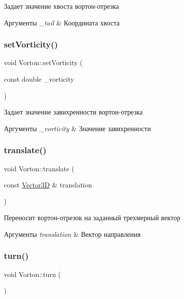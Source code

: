 Задает значение хвоста вортон-\/отрезка 
\begin{DoxyParams}{Аргументы}
{\em \+\_\+tail} & Координата хвоста \\
\hline
\end{DoxyParams}
\mbox{\label{class_vorton_a2684a3a144977b936e7a046bbee1bf78}} 
\subsubsection{\texorpdfstring{set\+Vorticity()}{setVorticity()}}
{\footnotesize\ttfamily void Vorton\+::set\+Vorticity (\begin{DoxyParamCaption}\item[{const double}]{\+\_\+vorticity }\end{DoxyParamCaption})}

Задает значение завихренности вортон-\/отрезка 
\begin{DoxyParams}{Аргументы}
{\em \+\_\+vorticity} & Значение завихренности \\
\hline
\end{DoxyParams}
\mbox{\label{class_vorton_a0b826326d0c9c93298b95babb17b43a1}} 
\subsubsection{\texorpdfstring{translate()}{translate()}}
{\footnotesize\ttfamily void Vorton\+::translate (\begin{DoxyParamCaption}\item[{const \mbox{\hyperlink{class_vector3_d}{Vector3D}} \&}]{translation }\end{DoxyParamCaption})}

Переносит вортон-\/отрезок на заданный трехмерный вектор 
\begin{DoxyParams}{Аргументы}
{\em translation} & Вектор направления \\
\hline
\end{DoxyParams}
\mbox{\label{class_vorton_a2a9a3608f4296cadc7962661e854a765}} 
\subsubsection{\texorpdfstring{turn()}{turn()}}
{\footnotesize\ttfamily void Vorton\+::turn (\begin{DoxyParamCaption}{ }\end{DoxyParamCaption})}

